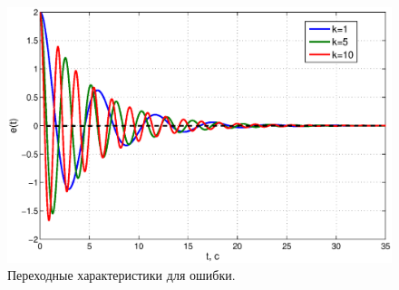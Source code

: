\documentclass[12pt,a4paper]{article}
\begin{document}
\begin{figure}[H]
	\centering
	\includegraphics[width=1\linewidth]{2.1.2.eps}
	\caption{Переходные характеристики для ошибки.}
\end{figure}
\end{document}
